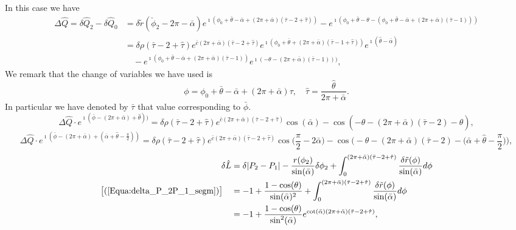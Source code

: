 \documentclass[reqno]{amsart}
\theoremstyle{definition} \newtheorem{definition}{Definition}[section]
\theoremstyle{definition} \newtheorem{remark}[definition]{Remark}
\theoremstyle{plain} \newtheorem{lemma}[definition]{Lemma}
\theoremstyle{plain} \newtheorem{proposition}[definition]{Proposition}
\theoremstyle{plain} \newtheorem{theorem}[definition]{Theorem}
\theoremstyle{plain} \newtheorem{corollary}[definition]{Corollary}
\theoremstyle{definition} \newtheorem{example}[definition]{Example}
\theoremstyle{plain} \newtheorem{claim}[clai]{Claim}
\theoremstyle{definition} \newtheorem{assumption}[definition]{Assumption}
\theoremstyle{definition} \newtheorem{observation}[definition]{Observation}
\newcommand{\1}{\mathbbm 1}
\renewcommand{\i}{\imath}
\numberwithin{equation}{section} %
\theoremstyle{plain} \newtheorem*{theorem*}{Theorem}
\theoremstyle{plain} \newtheorem{mthm}[maintheorem]{Main Theorem}
\theoremstyle{plain} \newtheorem*{mthm*}{Main Theorem}
\theoremstyle{plain} \newtheorem*{conjecture*}{Conjecture}
\theoremstyle{plain} \newtheorem{conjecture}[definition]{Conjecture}
\theoremstyle{plain} \newtheorem*{problem*}{Problem}
\begin{document}
In this case we have
\begin{align*}
\Delta\hat Q=\delta \hat Q_2 - \delta \hat Q_0 &= \delta \tilde r(\check \phi_2 - 2\pi - \bar \alpha) e^{\i (\phi_0 + \bar \theta -\bar \alpha + (2\pi + \bar \alpha) (\bar\tau - 2 + \hat \tau))} - e^{\i (\phi_0 + \bar \theta - \theta - (\phi_0 + \bar \theta - \bar \alpha + (2\pi + \bar \alpha) (\bar\tau - 1)))} \\
&= \delta \rho(\bar \tau - 2 + \hat \tau) e^{\bar c (2\pi + \bar \alpha) (\bar \tau - 2 + \hat \tau)} e^{\i (\phi_0 + \bar \theta + (2\pi + \bar \alpha) (\bar\tau - 1 + \hat \tau))} e^{\i (\hat \theta - \bar \alpha)} \\
& \quad - e^{\i (\phi_0 + \bar \theta - \bar \alpha + (2\pi + \bar \alpha) (\bar\tau - 1))} e^{\i (- \theta - (2\pi + \bar \alpha) (\bar\tau - 1)))},
\end{align*}
We remark that the change of variables we have used is
\begin{equation*}
	\phi=\phi_0+\bar\theta-\bar\alpha+(2\pi+\bar\alpha)\tau, \quad \hat \tau = \frac{\hat \theta}{2\pi + \bar \alpha}.
	\end{equation*}
In particular we have denoted by $\bar\tau$ that value corresponding to $\bar\phi$.
\begin{equation*}
\Delta \hat Q \cdot e^{\i (\bar \phi - (2\pi + \bar \alpha) + \hat \theta))} = \delta \rho(\bar \tau - 2 + \hat \tau) e^{\bar c (2\pi + \bar \alpha) (\bar \tau - 2 + \hat \tau)} \cos(\bar \alpha) - \cos(- \theta - (2\pi + \bar \alpha) (\bar \tau - 2) - \hat \theta),
\end{equation*}
\begin{equation*}
\Delta \hat Q \cdot e^{\i (\bar \phi - (2\pi + \bar \alpha) + (\bar \alpha + \hat \theta - \frac{\pi}{2}))} = \delta \rho(\bar \tau - 2 + \hat \tau) e^{\bar c (2\pi + \bar \alpha) (\bar \tau - 2 + \hat \tau)} \cos \bigg( \frac{\pi}{2} - 2 \bar \alpha \bigg) - \cos \bigg(- \theta - (2\pi + \bar \alpha) (\bar\tau - 2) - \bigg( \bar \alpha + \hat \theta - \frac{\pi}{2} \bigg) \bigg),
\end{equation*}
\begin{align*}
\delta \hat L %
&= \delta |P_2 - P_1| - \frac{r(\phi_2)}{\sin(\bar \alpha)} \delta \phi_2 + \int_0^{(2\pi + \bar \alpha)(\bar\tau - 2 + \hat \tau)} \frac{\delta \tilde r(\phi)}{\sin(\bar \alpha)} d\phi \\
\big[ (\ref{Equa:delta_P_2P_1_segm}) \big] \quad &= - 1 + \frac{1 - \cos(\theta)}{\sin(\bar \alpha)^2} + \int_0^{(2\pi + \bar \alpha)(\bar\tau - 2 + \hat \tau)} \frac{\delta \tilde r(\phi)}{\sin(\bar \alpha)} d\phi \\
&= - 1 + \frac{1 - \cos(\theta)}{\sin^2(\bar \alpha)} e^{\cot(\bar \alpha)(2\pi + \bar \alpha)(\bar\tau - 2 + \hat \tau)},
\end{align*}
\end{document}
